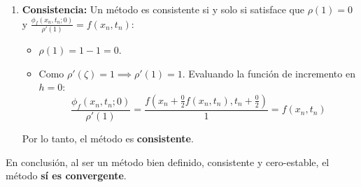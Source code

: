 \begin{sol}
\begin{enumerate}
    \item \textbf{Consistencia:}
    Un método es consistente si y solo si satisface que $\rho(1) = 0$ y $\frac{\phi_f(x_n, t_n; 0)}{\rho'(1)} = f(x_n, t_n)$:
    \begin{itemize}
        \item $\rho(1) = 1 - 1 = 0$.
        \item Como $\rho'(\zeta) = 1 \implies \rho'(1) = 1$. Evaluando la función de incremento en $h = 0$:
        $$
        \frac{\phi_f(x_n, t_n; 0)}{\rho'(1)} = \frac{f\left(x_n + \frac{0}{2} f(x_n, t_n), t_n + \frac{0}{2}\right)}{1} = f(x_n, t_n)
        $$
    \end{itemize}
    Por lo tanto, el método es \textbf{consistente}.
\end{enumerate}

En conclusión, al ser un método bien definido, consistente y cero-estable, el método \textbf{sí es convergente}.
\end{sol}

\vspace{0.5cm}

